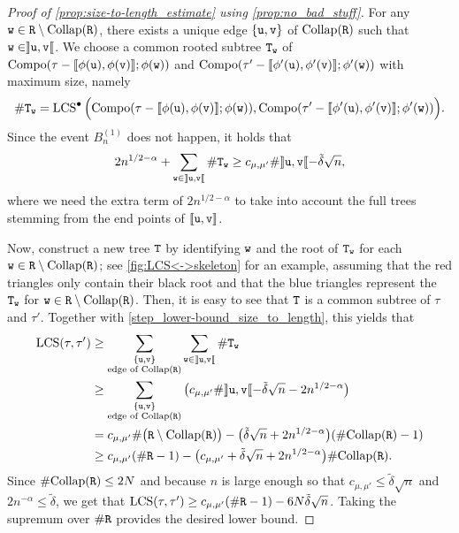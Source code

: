 \documentclass[11pt,reqno]{amsart}
\newcommand{\LCS}{\operatorname{LCS}}
\begin{document}
\begin{proof}[Proof of \cref{prop:size-to-length_estimate} using \cref{prop:no_bad_stuff}]
For any $\mathtt{w}\in\mathtt{R}\setminus\mathrm{Collap}(\mathtt{R})$, there exists a unique edge $\{\mathtt{u},\mathtt{v}\}$ of $\mathrm{Collap}(\mathtt{R})$ such that $\mathtt{w}\in\rrbracket \mathtt{u},\mathtt{v}\llbracket$. We choose a common rooted subtree $\mathtt{T}_{\mathtt{w}}$ of $\mathrm{Compo}(\tau-\llbracket \phi(\mathtt{u}),\phi(\mathtt{v})\rrbracket;\phi(\mathtt{w}))$ and $\mathrm{Compo}(\tau'-\llbracket \phi'(\mathtt{u}),\phi'(\mathtt{v})\rrbracket;\phi'(\mathtt{w}))$ with maximum size, namely
\[\#\ttT_\ttw=\LCS^\bullet\Big(\mathrm{Compo}(\tau-\llbracket \phi(\ttu),\phi(\ttv)\rrbracket;\phi(\ttw)),\mathrm{Compo}(\tau'-\llbracket \phi'(\ttu),\phi'(\ttv)\rrbracket;\phi'(\ttw))\Big).\]
Since the event $B_n^{(1)}$ does not happen, it holds that
\begin{equation}
\label{step_lower-bound_size_to_length}
2n^{1/2-\alpha}+\sum_{\mathtt{w}\in\rrbracket \mathtt{u},\mathtt{v}\llbracket}\#\mathtt{T}_{\mathtt{w}}\geq c_{\mu,\mu'}\#\rrbracket \mathtt{u},\mathtt{v}\llbracket -\tilde{\delta}\sqrt{n},
\end{equation}
where we need the extra term of $2n^{1/2-\alpha}$ to take into account the full trees stemming from  the end points of  $\llbracket \mathtt{u},\mathtt{v}\rrbracket$.
\smallskip

Now, construct a new tree $\mathtt{T}$ by identifying $\mathtt{w}$ and the root of $\mathtt{T}_{\mathtt{w}}$ for each $\mathtt{w}\in\mathtt{R}\setminus\mathrm{Collap}(\mathtt{R})$; see \cref{fig:LCS<->skeleton} for an example, assuming that the red triangles only contain their black root and that the blue triangles represent the $\mathtt{T}_{\mathtt{w}}$ for $\mathtt{w}\in\mathtt{R}\setminus\mathrm{Collap}(\mathtt{R})$. Then, it is easy to see that $\mathtt{T}$ is a common subtree of $\tau$ and $\tau'$. 
Together with \eqref{step_lower-bound_size_to_length}, this yields that
\begin{align*}
\LCS(\tau,\tau')&\geq \sum_{\substack{\{\ttu,\ttv\}\\ \text{edge of }\mathrm{Collap}(\ttR)}}\sum_{\ttw\in\rrbracket\ttu,\ttv\llbracket}\#\ttT_\ttw\\
&\geq \sum_{\substack{\{\ttu,\ttv\}\\ \text{edge of }\mathrm{Collap}(\ttR)}}\big(c_{\mu,\mu'}\#\rrbracket \ttu,\ttv\llbracket -\tilde{\delta}\sqrt{n}-2n^{1/2-\alpha}\big)\\
&=c_{\mu,\mu'}\#\big(\ttR\setminus \mathrm{Collap}(\ttR)\big) -\big(\tilde{\delta}\sqrt{n}+2n^{1/2-\alpha}\big)(\#\mathrm{Collap}(\ttR)-1)\\
&\geq c_{\mu,\mu'}(\#\ttR -1) -\big(c_{\mu,\mu'}+\tilde{\delta}\sqrt{n}+2n^{1/2-\alpha}\big)\#\mathrm{Collap}(\ttR).
\end{align*}
Since $\#\mathrm{Collap}(\mathtt{R})\leq 2N$ and because $n$ is large enough so that $c_{\mu,\mu'}\leq \tilde{\delta}\sqrt{n}$ and $2n^{-\alpha}\leq \tilde{\delta}$, we get that $\LCS(\tau,\tau')\geq c_{\mu,\mu'}(\#\ttR-1)-6N\tilde{\delta}\sqrt{n}$. Taking the supremum over $\#\mathtt{R}$ provides the desired lower bound.


\end{proof}
\end{document}
